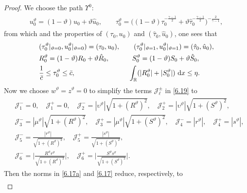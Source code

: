 \documentclass[11pt,reqno]{article}
\newcommand{\fr}{\frac}
\numberwithin{equation}{section}
\begin{document}
\begin{proof}
We choose the path $\Upsilon^0$:
\begin{align}\label{7.33}
\begin{split}
u_{0}^\vartheta=(1-\vartheta)u_0 +\vartheta\hat{u}_0,\qquad \tau_{0}^\vartheta =\Big((1-\vartheta)\tau_{0}^{-\fr{\gamma-1}{2}} +\vartheta\hat{\tau}_{0}^{-\fr{\gamma-1}{2}}  \Big)^{-\fr{2}{\gamma-1}},
\end{split}
\end{align}
from which and the properties of $(\tau_0, u_0)$ and $(\hat{\tau}_0, \hat{u}_0)$,  one sees that
\begin{align}\label{7.34}
\begin{split}
&(\tau_{0}^\vartheta|_{\vartheta=0}, u_{0}^\vartheta|_{\vartheta=0})=(\tau_0, u_0), \qquad  (\tau_{0}^\vartheta|_{\vartheta=1}, u_{0}^\vartheta|_{\vartheta=1})=(\hat{\tau}_0, \hat{u}_0), \\ &
R_{0}^\vartheta =(1-\vartheta)R_0+\vartheta \hat{R}_0,\qquad \quad \ S_{0}^\vartheta =(1-\vartheta)S_0+\vartheta \hat{S}_0, \\
& \fr{1}{\bar{c}}\leq \tau_{0}^\vartheta\leq \bar{c}, \qquad \qquad \qquad \qquad   \int_{\mathbb{R}} (|R_{0}^\vartheta| +|S_{0}^\vartheta|)\ {\rm d}x\leq \eta.
\end{split}
\end{align}
Now we choose $w^\vartheta=z^\vartheta=0$ to simplify the terms $\mathcal{J}_{\ell}^\pm$ in \eqref{6.19} to
\begin{align}\label{7.35}
\begin{split}
& \mathcal{J}_{1}^-=0, \quad \mathcal{J}_{1}^+=0, \quad
\mathcal{J}_{2}^-=|\upsilon^\vartheta|\sqrt{1+(R^\vartheta)^2}, \quad \mathcal{J}_{2}^+=|\upsilon^\vartheta|\sqrt{1+(S^\vartheta)^2},  \\
& \mathcal{J}_{3}^-=|\mu^\vartheta |\sqrt{1+(R^\vartheta)^2},\quad \mathcal{J}_{3}^+=|\mu^\vartheta |\sqrt{1+(S^\vartheta)^2}, \quad
\mathcal{J}_{4}^-=|r^\vartheta|, \quad \mathcal{J}_{4}^+=|s^\vartheta|, \\
&\mathcal{J}_{5}^-= \fr{|r^\vartheta|}{\sqrt{1+(R^\vartheta)^2}},\quad  \mathcal{J}_{5}^+= \fr{|s^\vartheta|}{\sqrt{1+(S^\vartheta)^2}}, \\
&\mathcal{J}_{6}^-=\Big|\fr{R^\vartheta r^\vartheta}{\sqrt{1+(R^\vartheta)^2}}\Big|, \quad \mathcal{J}_{6}^+=\Big|\fr{S^\vartheta s^\vartheta}{\sqrt{1+(S^\vartheta)^2}} \Big|.
\end{split}
\end{align}
Then the norms in \eqref{6.17a} and \eqref{6.17} reduce, respectively, to
\begin{align}\label{7.36}

\end{align}
\end{proof}
\end{document}
